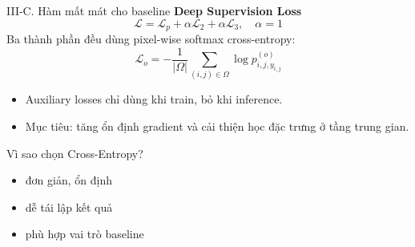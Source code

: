 \begin{frame}{III-C. Hàm mất mát cho baseline}
      \textbf{Deep Supervision Loss}
      \[
        \mathcal{L} = \mathcal{L}_p + \alpha\mathcal{L}_2 + \alpha\mathcal{L}_3,\quad \alpha=1
      \]
      Ba thành phần đều dùng pixel-wise softmax cross-entropy:
      \[
        \mathcal{L}_o = -\frac{1}{|\Omega|}\sum_{(i,j)\in\Omega}\log p^{(o)}_{i,j,y_{i,j}}
      \]
      \begin{itemize}
        \item Auxiliary losses chỉ dùng khi train, bỏ khi inference.
        \item Mục tiêu: tăng ổn định gradient và cải thiện học đặc trưng ở tầng trung gian.
      \end{itemize}
      \begin{block}{Vì sao chọn Cross-Entropy?}
        \begin{itemize}
          \item đơn giản, ổn định
          \item dễ tái lập kết quả
          \item phù hợp vai trò baseline
        \end{itemize}
      \end{block}
\end{frame}

